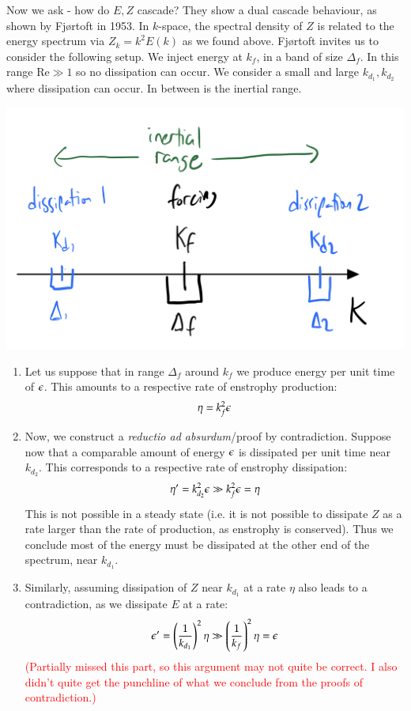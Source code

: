 Now we ask - how do $E, Z$ cascade? They show a dual cascade behaviour, as shown by Fjørtoft in 1953. In $k$-space, the spectral density of $Z$ is related to the energy spectrum via $Z_k = k^2E(k)$ as we found above. Fjørtoft invites us to consider the following setup. We inject energy at $k_f$, in a band of size $\Delta_f$. In this range $\text{Re} \gg 1$ so no dissipation can occur. We consider a small and large $k_{d_1}, k_{d_2}$ where dissipation can occur. In between is the inertial range.

\begin{center}
    \includegraphics[scale=0.35]{Lectures/Images/lec14-kscale.png}
\end{center}

\begin{enumerate}
    \item Let us suppose that in range $\Delta_f$ around $k_f$ we produce energy per unit time of $\epsilon$. This amounts to a respective rate of enstrophy production:
    \begin{equation}
        \eta = k_f^2\epsilon
    \end{equation}
    \item Now, we construct a \emph{reductio ad absurdum}/proof by contradiction. Suppose now that a comparable amount of energy $\epsilon$ is dissipated per unit time near $k_{d_2}$. This corresponds to a respective rate of enstrophy dissipation:
    \begin{equation}
        \eta' = k_{d_2}^2\epsilon \gg k_f^2\epsilon = \eta
    \end{equation}
    This is not possible in a steady state (i.e. it is not possible to dissipate $Z$ as a rate larger than the rate of production, as enstrophy is conserved). Thus we conclude most of the energy must be dissipated at the other end of the spectrum, near $k_{{d_1}}$.
    \item Similarly, assuming dissipation of $Z$ near $k_{d_1}$ at a rate $\eta$ also leads to a contradiction, as we dissipate $E$ at a rate:
    \begin{equation}
        \epsilon' = \left(\frac{1}{k_{d_1}}\right)^2\eta \gg \left(\frac{1}{k_f}\right)^2\eta = \epsilon
    \end{equation}
    \textcolor{red}{(Partially missed this part, so this argument may not quite be correct. I also didn't quite get the punchline of what we conclude from the proofs of contradiction.)}
\end{enumerate}

